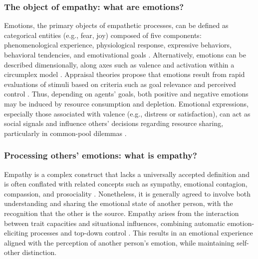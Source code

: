 \subsubsection{The object of empathy: what are emotions?}
Emotions, the primary objects of empathetic processes, can be defined as categorical entities (e.g., fear, joy) composed of five components: phenomenological experience, physiological response, expressive behaviors, behavioral tendencies, and emotivational goals \cite{rosemanEmotionalBehaviorsEmotivational2011}. Alternatively, emotions can be described dimensionally, along axes such as valence and activation within a circumplex model \cite{russellCoreAffectPsychological2003,rosemanEmotionalBehaviorsEmotivational2011}. Appraisal theories propose that emotions result from rapid evaluations of stimuli based on criteria such as goal relevance and perceived control \cite{broschCommentAppraisingBrain2013,moorsPowerGoalDirectedProcesses2017}. Thus, depending on agents' goals, both positive and negative emotions may be induced by resource consumption and depletion. Emotional expressions, especially those associated with valence (e.g., distress or satisfaction), can act as social signals and influence others' decisions regarding resource sharing, particularly in common-pool dilemmas \cite{lynneTheoreticalFoundationEmpathy2016}.

\subsubsection{Processing others' emotions: what is empathy?}
Empathy is a complex construct that lacks a universally accepted definition and is often conflated with related concepts such as sympathy, emotional contagion, compassion, and prosociality \cite{cuffEmpathyReviewConcept2016}. Nonetheless, it is generally agreed to involve both understanding and sharing the emotional state of another person, with the recognition that the other is the source. Empathy arises from the interaction between trait capacities and situational influences, combining automatic emotion-eliciting processes and top-down control \cite{cuffEmpathyReviewConcept2016}. This results in an emotional experience aligned with the perception of another person's emotion, while maintaining self-other distinction.

